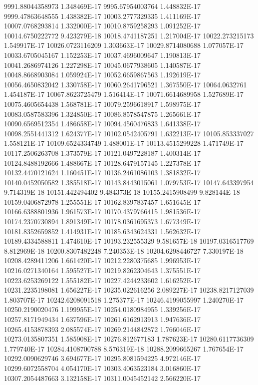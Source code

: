 9991.88044358973  1.348469E-17
9995.67954003764  1.448832E-17
9999.47863648555  1.438382E-17
10003.2777329335  1.411169E-17
10007.0768293814  1.332000E-17
10010.8759258293  1.091252E-17
10014.6750222772  9.423279E-18
10018.4741187251  1.217004E-17
10022.273215173  1.549917E-17
10026.0723116209  1.303663E-17
10029.8714080688  1.077057E-17
10033.6705045167  1.152253E-17
10037.4696009647  1.190813E-17
10041.2686974126  1.227298E-17
10045.0677938605  1.140587E-17
10048.8668903084  1.059924E-17
10052.6659867563  1.192619E-17
10056.4650832042  1.330758E-17
10060.2641796521  1.367550E-17
10064.0632761  1.454187E-17
10067.8623725479  1.516414E-17
10071.6614689958  1.527689E-17
10075.4605654438  1.568781E-17
10079.2596618917  1.598975E-17
10083.0587583396  1.324850E-17
10086.8578547875  1.265661E-17
10090.6569512354  1.486658E-17
10094.4560476833  1.641338E-17
10098.2551441312  1.624377E-17
10102.0542405791  1.632213E-17
10105.853337027  1.558121E-17
10109.6524334749  1.488001E-17
10113.4515299228  1.471749E-17
10117.2506263708  1.373579E-17
10121.0497228187  1.400314E-17
10124.8488192666  1.488667E-17
10128.6479157145  1.227378E-17
10132.4470121624  1.160451E-17
10136.2461086103  1.381832E-17
10140.0452050582  1.385518E-17
10143.8443015061  1.079753E-17
10147.643397954  9.714319E-18
10151.442494402  9.484373E-18
10155.2415908499  9.828144E-18
10159.0406872978  1.255551E-17
10162.8397837457  1.651645E-17
10166.6388801936  1.961573E-17
10170.4379766415  1.981536E-17
10174.2370730894  1.891349E-17
10178.0361695373  1.677349E-17
10181.8352659852  1.414931E-17
10185.6343624331  1.562632E-17
10189.4334588811  1.474610E-17
10193.232555329  9.581657E-18
10197.0316517769  8.812969E-18
10200.8307482248  7.240353E-18
10204.6298446727  7.330197E-18
10208.4289411206  1.661420E-17
10212.2280375685  1.996953E-17
10216.0271340164  1.595527E-17
10219.8262304643  1.375551E-17
10223.6253269122  1.555182E-17
10227.4244233602  1.616252E-17
10231.2235198081  1.656227E-17
10235.022616256  2.089227E-17
10238.8217127039  1.803707E-17
10242.6208091518  1.275377E-17
10246.4199055997  1.240270E-17
10250.2190020476  1.199955E-17
10254.0180984955  1.339256E-17
10257.8171949434  1.637596E-17
10261.6162913913  1.947636E-17
10265.4153878393  2.085574E-17
10269.2144842872  1.766046E-17
10273.0135807351  1.585908E-17
10276.812677183  1.787623E-17
10280.6117736309  1.779740E-17
10284.4108700788  8.576319E-18
10288.2099665267  1.767654E-17
10292.0090629746  3.694677E-17
10295.8081594225  4.972146E-17
10299.6072558704  4.054170E-17
10303.4063523184  3.016860E-17
10307.2054487663  3.132158E-17
10311.0045452142  2.566220E-17
